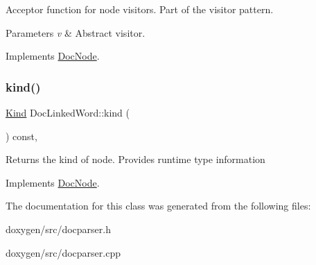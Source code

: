 Acceptor function for node visitors. Part of the visitor pattern. 
\begin{DoxyParams}{Parameters}
{\em v} & Abstract visitor. \\
\hline
\end{DoxyParams}


Implements \mbox{\hyperlink{class_doc_node_a5303a550cbe6395663bf9b9dad28cbf1}{Doc\+Node}}.

\mbox{\label{class_doc_linked_word_aef22b3a37583c764a6be0ed1a1ff6dd5}} 
\subsubsection{\texorpdfstring{kind()}{kind()}}
{\footnotesize\ttfamily \mbox{\hyperlink{class_doc_node_aebd16e89ca590d84cbd40543ea5faadb}{Kind}} Doc\+Linked\+Word\+::kind (\begin{DoxyParamCaption}{ }\end{DoxyParamCaption}) const\hspace{0.3cm}{\ttfamily [inline]}, {\ttfamily [virtual]}}

Returns the kind of node. Provides runtime type information 

Implements \mbox{\hyperlink{class_doc_node_a108ffd214a72ba6e93dac084a8f58049}{Doc\+Node}}.



The documentation for this class was generated from the following files\+:\begin{DoxyCompactItemize}
\item 
doxygen/src/docparser.\+h\item 
doxygen/src/docparser.\+cpp\end{DoxyCompactItemize}
